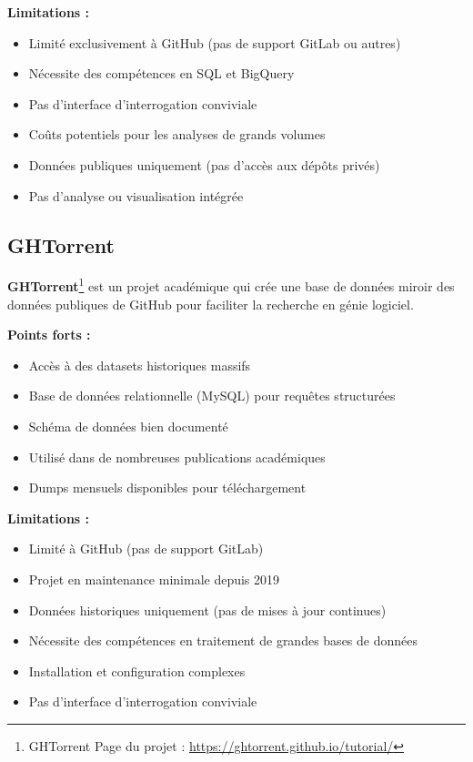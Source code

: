 \textbf{Limitations :}
\begin{itemize}
    \item Limité exclusivement à GitHub (pas de support GitLab ou autres)
    \item Nécessite des compétences en SQL et BigQuery
    \item Pas d'interface d'interrogation conviviale
    \item Coûts potentiels pour les analyses de grands volumes
    \item Données publiques uniquement (pas d'accès aux dépôts privés)
    \item Pas d'analyse ou visualisation intégrée
\end{itemize}

\subsection{GHTorrent}

\textbf{GHTorrent}\footnote{GHTorrent Page du projet : \url{https://ghtorrent.github.io/tutorial/}} est un projet académique qui crée une base de données miroir des données publiques de GitHub pour faciliter la recherche en génie logiciel.

\textbf{Points forts :}
\begin{itemize}
    \item Accès à des datasets historiques massifs
    \item Base de données relationnelle (MySQL) pour requêtes structurées
    \item Schéma de données bien documenté
    \item Utilisé dans de nombreuses publications académiques
    \item Dumps mensuels disponibles pour téléchargement
\end{itemize}

\textbf{Limitations :}
\begin{itemize}
    \item Limité à GitHub (pas de support GitLab)
    \item Projet en maintenance minimale depuis 2019
    \item Données historiques uniquement (pas de mises à jour continues)
    \item Nécessite des compétences en traitement de grandes bases de données
    \item Installation et configuration complexes
    \item Pas d'interface d'interrogation conviviale
\end{itemize}


